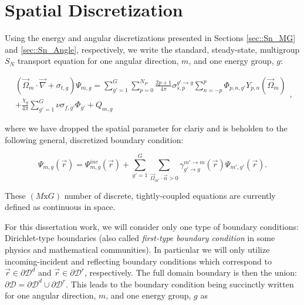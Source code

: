 \section{Spatial Discretization}
\label{sec::Sn_Spatial}

Using the energy and angular discretizations presented in Sections \ref{sec::Sn_MG} and \ref{sec::Sn_Angle}, respectively, we write the standard, steady-state, multigroup $S_N$ transport equation for one angular direction, $m$, and one energy group, $g$:

\begin{equation}
\label{eq::Sn_mg_sn_trans_eq}
\begin{aligned}
	 \left( \vec{\Omega}_m \cdot \vec{\nabla}  + \sigma_{t,g}  \right)  \Psi_{m,g}= \sum_{g'=1}^{G} \sum_{p=0}^{N_P} \frac{2p + 1}{4 \pi} \sigma_{s,p}^{g' \rightarrow g}   \sum_{n=-p}^{p}  \Phi_{p,n,g'}  Y_{p,n} (  \vec{\Omega}_m )  \\
	+ \frac{\chi_g}{4 \pi} \sum_{g'=1}^{G} \nu \sigma_{f,g'} \Phi_{g'}   + Q_{m,g}
\end{aligned} , 
\end{equation}

\noindent where we have dropped the spatial parameter for clariy and is beholden to the following general, discretized boundary condition:

\begin{equation}
\label{eq::Sn_mg_sn_trans_eq_bc}
\Psi_{m,g} (\vec{r}) = \Psi^{inc}_{m,g} (\vec{r}) + \sum_{g'=1}^{G} \sum_{\vec{\Omega}_{m'} \cdot \vec{n} > 0} \gamma_{g' \rightarrow g}^{m' \rightarrow m} (\vec{r})  \Psi_{m',g'} (\vec{r})  .
\end{equation}

\noindent These $(M \text{x} G)$ number of discrete, tightly-coupled equations are currently defined as continuous in space.

For this dissertation work, we will consider only one type of boundary conditions: Dirichlet-type boundaries (also called {\em first-type boundary condition} in some physics and mathematical communities). In particular we will only utilize incoming-incident and reflecting boundary conditions which correspond to $\vec{r} \in \partial \mathcal{D}^d$ and $\vec{r} \in \partial \mathcal{D}^r$, respectively. The full domain boundary is then the union: $\partial \mathcal{D} = \partial \mathcal{D}^d \cup \partial \mathcal{D}^r$. This leads to the boundary condition being succinctly written for one angular direction, $m$, and one energy group, $g$ as


